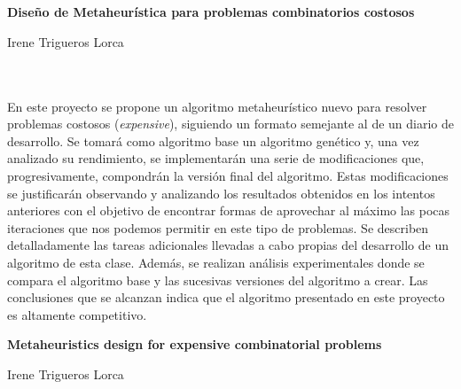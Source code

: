 \chapter*{}






\cleardoublepage
\thispagestyle{empty}

\begin{center}
{\large\bfseries Diseño de Metaheurística para problemas combinatorios costosos}\\
\end{center}
\begin{center}
Irene Trigueros Lorca\\
\end{center}

\\

\vspace{0.7cm}
\\

En este proyecto se propone un algoritmo metaheurístico nuevo para resolver problemas costosos (\textit{expensive}), siguiendo un formato semejante al de un diario de desarrollo. 
Se tomará como algoritmo base un algoritmo genético y, una vez analizado su rendimiento, se implementarán una serie de modificaciones que, progresivamente, compondrán la versión final del algoritmo. 
Estas modificaciones se justificarán observando y analizando los resultados obtenidos en los intentos anteriores con el objetivo de encontrar formas de aprovechar al máximo las pocas iteraciones que nos podemos permitir en este tipo de problemas. 
Se describen detalladamente las tareas adicionales llevadas a cabo propias del desarrollo de un algoritmo de esta clase. 
Además, se realizan análisis experimentales donde se compara el algoritmo base y las sucesivas versiones del algoritmo a crear. 
Las conclusiones que se alcanzan indica que el algoritmo presentado en este proyecto es altamente competitivo. 



\cleardoublepage


\thispagestyle{empty}


\begin{center}
{\large\bfseries Metaheuristics design for expensive combinatorial problems }\\
\end{center}
\begin{center}
Irene Trigueros Lorca\\
\end{center}

